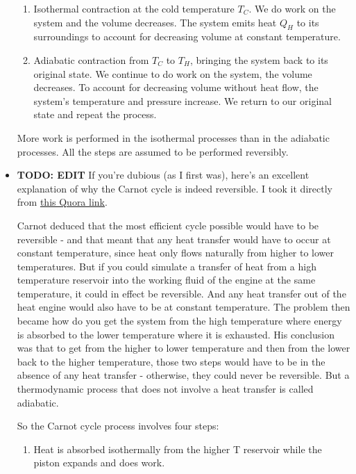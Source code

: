 \documentclass[11pt, a4paper]{article}
\begin{document}
\begin{itemize}
\begin{enumerate}
		\item Isothermal contraction at the cold temperature $ T_{C} $. We do work on the system and the volume decreases. The system emits heat $ Q_{H} $ to its surroundings to account for decreasing volume at constant temperature.
		
		\item Adiabatic contraction from $ T_{C} $ to $ T_{H} $, bringing the system back to its original state. We continue to do work on the system, the volume decreases. To account for decreasing volume without heat flow, the system's temperature and pressure increase. We return to our original state and repeat the process.
	\end{enumerate}
	More work is performed in the isothermal processes than in the adiabatic processes. All the steps are assumed to be performed reversibly.

	\item \textbf{TODO: EDIT} If you're dubious (as I first was), here's an excellent explanation of why the Carnot cycle is indeed reversible. I took it directly from \href{https://www.quora.com/Why-do-we-say-that-the-Carnot-cycle-is-reversible}{this Quora link}.
	
	Carnot deduced that the most efficient cycle possible would have to be reversible - and that meant that any heat transfer would have to occur at constant temperature, since heat only flows naturally from higher to lower temperatures. But if you could simulate a transfer of heat from a high temperature reservoir into the working fluid of the engine at the same temperature, it could in effect be reversible. And any heat transfer out of the heat engine would also have to be at constant temperature. The problem then became how do you get the system from the high temperature where energy is absorbed to the lower temperature where it is exhausted. His conclusion was that to get from the higher to lower temperature and then from the lower back to the higher temperature, those two steps would have to be in the absence of any heat transfer - otherwise, they could never be reversible. But a thermodynamic process that does not involve a heat transfer is called adiabatic.
	
	So the Carnot cycle process involves four steps:
	
	\begin{enumerate}
		\item 	Heat is absorbed isothermally from the higher T reservoir while the piston expands and does work.
		

\end{enumerate}
\end{itemize}
\end{document}
